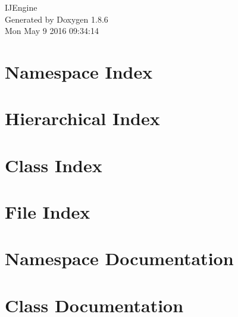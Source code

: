 \documentclass[twoside]{book}
\newcommand{\clearemptydoublepage}{%
  \newpage{\pagestyle{empty}\cleardoublepage}%
}
\begin{document}
\hypersetup{pageanchor=false}
\begin{titlepage}
\vspace*{7cm}
\begin{center}%
{\Large I\-J\-Engine }\\
\vspace*{1cm}
{\large Generated by Doxygen 1.8.6}\\
\vspace*{0.5cm}
{\small Mon May 9 2016 09:34:14}\\
\end{center}
\end{titlepage}
\clearemptydoublepage
\tableofcontents
\clearemptydoublepage
{}
\hypersetup{pageanchor=true}

\chapter{Namespace Index}

\chapter{Hierarchical Index}

\chapter{Class Index}

\chapter{File Index}

\chapter{Namespace Documentation}

\chapter{Class Documentation}
























\end{document}
